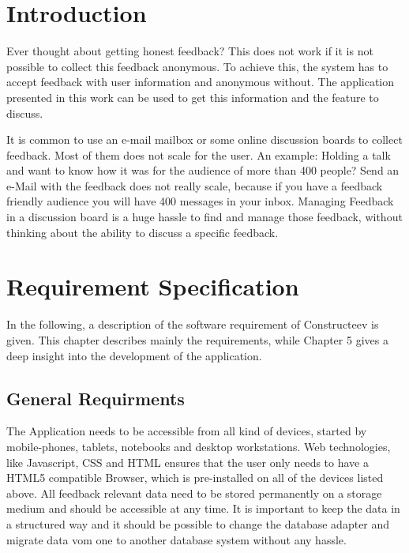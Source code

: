 
\cleardoublepage

\chapter{Introduction}

\setcounter{page}{1}

Ever thought about getting honest feedback? This does not work if it is not possible to collect this feedback anonymous. To achieve this, the system has to accept feedback with user information and anonymous without. The application presented in this work can be used to get this information and the feature to discuss. 

It is common to use an e-mail mailbox or some online discussion boards to collect feedback. Most of them does not scale for the user. An example: Holding a talk and want to know how it was for the audience of more than 400 people? Send an e-Mail with the feedback does not really scale, because if you have a feedback friendly audience you will have 400 messages in your inbox. Managing Feedback in a discussion board is a huge hassle to find and manage those feedback, without thinking about the ability to discuss a specific feedback. 

\cleardoublepage
\chapter{Requirement Specification}

In the following, a description of the software requirement of Constructeev is given. This chapter describes mainly the requirements, while Chapter 5 gives a deep insight into the development of the application. 
 
\section{General Requirments}
The Application needs to be accessible from all kind of devices, started by mobile-phones, tablets, notebooks and desktop workstations. Web technologies, like Javascript, CSS and HTML  ensures that the user only needs to have a HTML5 compatible Browser, which is pre-installed on all of the devices listed above.
All feedback relevant data need to be stored permanently on a storage medium and should be accessible at any time. It is important to keep the data in a structured way and it should be possible to change the database adapter and migrate data vom one to another database system without any hassle.

